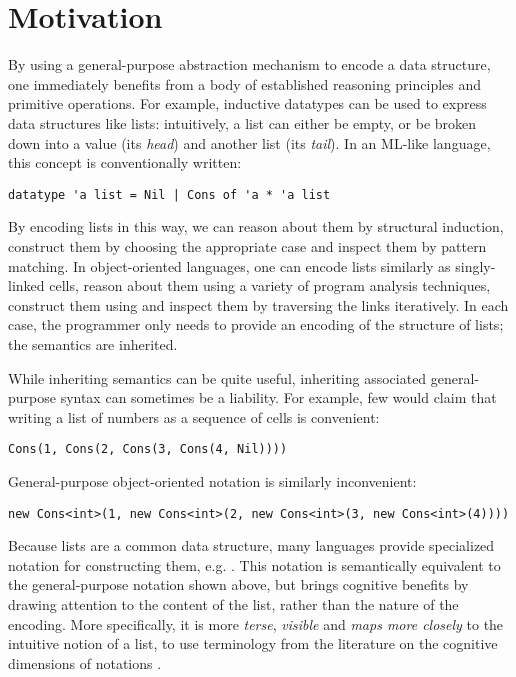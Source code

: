 \section{Motivation}
\label{s:intro}
By using a general-purpose abstraction mechanism to encode a data structure, one immediately benefits from a body of established reasoning principles and primitive operations. For example, inductive datatypes can be used to express data structures like lists: intuitively, a list can either be empty, or be broken down into a value (its \emph{head}) and another list (its \emph{tail}). In an ML-like language, this concept is conventionally written:
\begin{lstlisting}
datatype 'a list = Nil | Cons of 'a * 'a list
\end{lstlisting}
By encoding lists in this way, we can reason about them by structural induction, construct them by choosing the appropriate case and inspect them by pattern matching. In object-oriented languages, one can encode lists similarly as singly-linked cells, reason about them using a variety of program analysis techniques, construct them using  and inspect them by traversing the links iteratively. In each case, the programmer only needs to provide an encoding of the structure of lists; the semantics are inherited.

While inheriting semantics can be quite useful, inheriting associated general-purpose syntax can sometimes be a liability. For example, few would claim that writing a list of numbers as a sequence of  cells is convenient:
\begin{lstlisting}
Cons(1, Cons(2, Cons(3, Cons(4, Nil))))
\end{lstlisting}
General-purpose object-oriented notation is similarly inconvenient:
\begin{lstlisting}
new Cons<int>(1, new Cons<int>(2, new Cons<int>(3, new Cons<int>(4))))
\end{lstlisting}
Because lists are a common data structure, many languages provide specialized notation for constructing them, e.g. \li{[1, 2, 3, 4]}. This notation is semantically equivalent to the general-purpose notation shown above, but brings cognitive benefits by drawing attention to the content of the list, rather than the nature of the encoding. More specifically, it is more \emph{terse}, \emph{visible} and \emph{maps more closely} to the intuitive notion of a list, to use terminology from the literature on the cognitive dimensions of notations \cite{green1996usability}.


